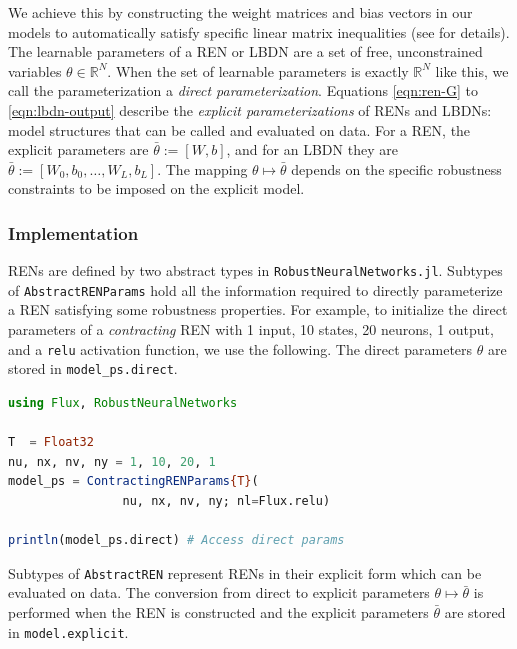 We achieve this by constructing the weight matrices and bias vectors in our models to automatically satisfy specific linear matrix inequalities (see \cite{Revay++2023} for details). The learnable parameters of a REN or LBDN are a set of free, unconstrained variables $\theta \in \mathbb{R}^N$. When the set of learnable parameters is exactly $\mathbb{R}^N$ like this, we call the parameterization a \textit{direct parameterization}. Equations \ref{eqn:ren-G} to \ref{eqn:lbdn-output} describe the \textit{explicit parameterizations} of RENs and LBDNs: model structures that can be called and evaluated on data. For a REN, the explicit parameters are $\bar{\theta} := [W, b]$, and for an LBDN they are $\bar{\theta} := [W_0, b_0, \ldots, W_L, b_L]$. The mapping $\theta \mapsto \bar{\theta}$ depends on the specific robustness constraints to be imposed on the explicit model. 

\subsubsection{Implementation} \label{sec:params-implementation}
RENs are defined by two abstract types in \verb|RobustNeuralNetworks.jl|. Subtypes of \verb|AbstractRENParams| hold all the information required to directly parameterize a REN satisfying some robustness properties. For example, to initialize the direct parameters of a \textit{contracting} REN with 1 input, 10 states, 20 neurons, 1 output, and a \texttt{relu} activation function, we use the following. The direct parameters $\theta$ are stored in \verb|model_ps.direct|. 

\begin{lstlisting}[language = Julia]
using Flux, RobustNeuralNetworks

T  = Float32
nu, nx, nv, ny = 1, 10, 20, 1
model_ps = ContractingRENParams{T}(
                nu, nx, nv, ny; nl=Flux.relu)
                
println(model_ps.direct) # Access direct params
\end{lstlisting}

Subtypes of \verb|AbstractREN| represent RENs in their explicit form which can be evaluated on data. The conversion from direct to explicit parameters $\theta \mapsto \bar{\theta}$ is performed when the REN is constructed and the explicit parameters $\bar{\theta}$ are stored in \verb|model.explicit|.

